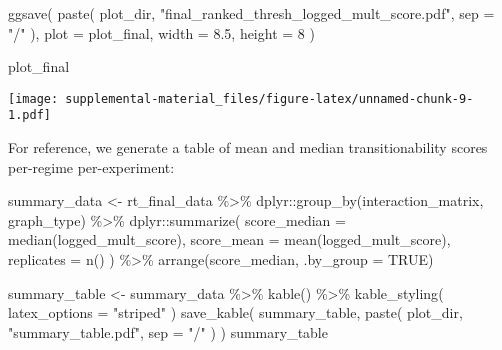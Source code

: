 \documentclass[
]{book}
\newenvironment{Shaded}{\begin{snugshade}}{\end{snugshade}}
\newcommand{\AttributeTok}[1]{\textcolor[rgb]{0.77,0.63,0.00}{#1}}
\newcommand{\ConstantTok}[1]{\textcolor[rgb]{0.00,0.00,0.00}{#1}}
\newcommand{\DecValTok}[1]{\textcolor[rgb]{0.00,0.00,0.81}{#1}}
\newcommand{\FloatTok}[1]{\textcolor[rgb]{0.00,0.00,0.81}{#1}}
\newcommand{\FunctionTok}[1]{\textcolor[rgb]{0.00,0.00,0.00}{#1}}
\newcommand{\NormalTok}[1]{#1}
\newcommand{\OtherTok}[1]{\textcolor[rgb]{0.56,0.35,0.01}{#1}}
\newcommand{\SpecialCharTok}[1]{\textcolor[rgb]{0.00,0.00,0.00}{#1}}
\newcommand{\StringTok}[1]{\textcolor[rgb]{0.31,0.60,0.02}{#1}}
\begin{document}
\begin{Shaded}
\begin{Highlighting}[]
\FunctionTok{ggsave}\NormalTok{(}
  \FunctionTok{paste}\NormalTok{(}
\NormalTok{    plot\_dir,}
    \StringTok{"final\_ranked\_thresh\_logged\_mult\_score.pdf"}\NormalTok{,}
    \AttributeTok{sep =} \StringTok{"/"}
\NormalTok{  ),}
  \AttributeTok{plot =}\NormalTok{ plot\_final,}
  \AttributeTok{width =} \FloatTok{8.5}\NormalTok{,}
  \AttributeTok{height =} \DecValTok{8}
\NormalTok{)}

\NormalTok{plot\_final}
\end{Highlighting}
\end{Shaded}

\texttt{[image: supplemental-material\_files/figure-latex/unnamed-chunk-9-1.pdf]}

For reference, we generate a table of mean and median transitionability scores per-regime per-experiment:

\begin{Shaded}
\begin{Highlighting}[]
\NormalTok{summary\_data }\OtherTok{\textless{}{-}}\NormalTok{ rt\_final\_data }\SpecialCharTok{\%\textgreater{}\%}
\NormalTok{  dplyr}\SpecialCharTok{::}\FunctionTok{group\_by}\NormalTok{(interaction\_matrix, graph\_type) }\SpecialCharTok{\%\textgreater{}\%}
\NormalTok{  dplyr}\SpecialCharTok{::}\FunctionTok{summarize}\NormalTok{(}
    \AttributeTok{score\_median =} \FunctionTok{median}\NormalTok{(logged\_mult\_score),}
    \AttributeTok{score\_mean =} \FunctionTok{mean}\NormalTok{(logged\_mult\_score),}
    \AttributeTok{replicates =} \FunctionTok{n}\NormalTok{()}
\NormalTok{  ) }\SpecialCharTok{\%\textgreater{}\%}
  \FunctionTok{arrange}\NormalTok{(score\_median, }\AttributeTok{.by\_group =} \ConstantTok{TRUE}\NormalTok{)}

\NormalTok{summary\_table }\OtherTok{\textless{}{-}}\NormalTok{ summary\_data }\SpecialCharTok{\%\textgreater{}\%}
  \FunctionTok{kable}\NormalTok{() }\SpecialCharTok{\%\textgreater{}\%}
  \FunctionTok{kable\_styling}\NormalTok{(}
    \AttributeTok{latex\_options =} \StringTok{"striped"}
\NormalTok{  )}
\FunctionTok{save\_kable}\NormalTok{(}
\NormalTok{  summary\_table,}
  \FunctionTok{paste}\NormalTok{(}
\NormalTok{    plot\_dir,}
    \StringTok{"summary\_table.pdf"}\NormalTok{,}
    \AttributeTok{sep =} \StringTok{"/"}
\NormalTok{  )}
\NormalTok{)}
\NormalTok{summary\_table}
\end{Highlighting}
\end{Shaded}
\end{document}
